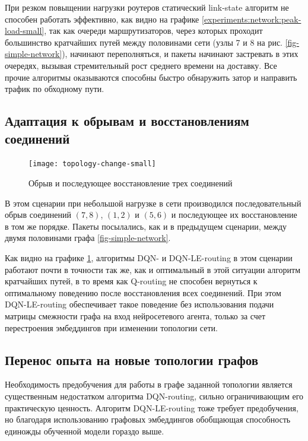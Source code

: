 \documentclass[specification,annotation,times]{itmo-student-thesis}
\theoremstyle{definition}
\begin{document}
При резком повыщении нагрузки роутеров статический link-state алгоритм не
способен работать эффективно, как видно на графике
\ref{experiments:network:peak-load-small}, так как очереди маршрутизаторов,
через которых проходит большинство кратчайших путей между половинами сети
(узлы 7 и 8 на рис. \ref{fig-simple-network}), начинают переполняться, и
пакеты начинают застревать в этих очередях, вызывая стремительный рост среднего
времени на доставку. Все прочие алгоритмы оказываются способны быстро обнаружить
затор и направить трафик по обходному пути.

\subsection{Адаптация к обрывам и восстановлениям соединений}\label{experiments:simple/links}

\begin{figure}[!h]
  \caption{Обрыв и последующее восстановление трех соединений}\label{experiments:network:topology-change-small}
  \centering
  \texttt{[image: topology-change-small]}
\end{figure}

В этом сценарии при небольшой нагрузке в сети производился последовательный
обрыв соединений $(7, 8)$, $(1, 2)$ и $(5, 6)$ и последующее их восстановление в том
же порядке. Пакеты посылались, как и в предыдущем сценарии, между двумя
половинами графа \ref{fig-simple-network}.

Как видно на графике \ref{experiments:network:topology-change-small}, алгоритмы
DQN- и DQN-LE-routing в этом сценарии работают почти в точности так же, как и
оптимальный в этой ситуации алгоритм кратчайших путей, в то время как Q-routing
не способен вернуться к оптимальному поведению после восстановления всех
соединений. При этом DQN-LE-routing обеспечивает такое поведение без
использования подачи матрицы смежности графа на вход нейросетевого агента,
только за счет перестроения эмбеддингов при изменении топологии сети.

\subsection{Перенос опыта на новые топологии графов}

Необходимость предобучения для работы в графе заданной топологии является
существенным недостатком алгоритма DQN-routing, сильно ограничивающим его
практическую ценность. Алгоритм DQN-LE-routing тоже требует предобучения, но
благодаря использованию графовых эмбеддингов обобщающая способность единожды
обученной модели гораздо выше.
\end{document}
